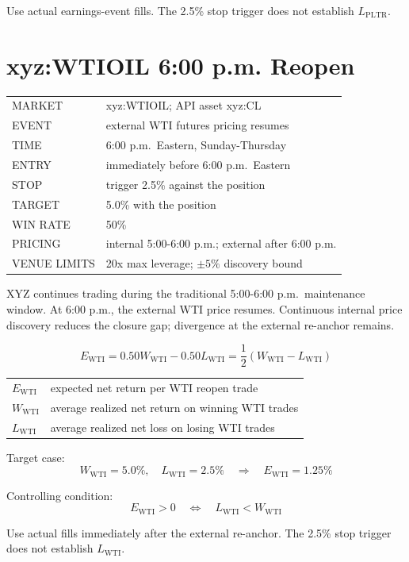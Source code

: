 \documentclass[10pt]{article}
\begin{document}
Use actual earnings-event fills. The 2.5\% stop trigger does not establish
$L_{\mathrm{PLTR}}$.

\section{xyz:WTIOIL 6:00 p.m. Reopen}

{\ttfamily\footnotesize
\begin{tabular}{@{}ll@{}}
MARKET & xyz:WTIOIL; API asset xyz:CL \\
EVENT & external WTI futures pricing resumes \\
TIME & 6:00 p.m.\ Eastern, Sunday-Thursday \\
ENTRY & immediately before 6:00 p.m.\ Eastern \\
STOP & trigger 2.5\% against the position \\
TARGET & 5.0\% with the position \\
WIN RATE & 50\% \\
PRICING & internal 5:00-6:00 p.m.; external after 6:00 p.m. \\
VENUE LIMITS & 20x max leverage; $\pm 5\%$ discovery bound
\end{tabular}}

XYZ continues trading during the traditional 5:00-6:00 p.m.\ maintenance
window. At 6:00 p.m., the external WTI price resumes. Continuous internal price
discovery reduces the closure gap; divergence at the external re-anchor remains.

\begin{equation}
  E_{\mathrm{WTI}}
  =0.50W_{\mathrm{WTI}}-0.50L_{\mathrm{WTI}}
  =\frac{1}{2}\left(W_{\mathrm{WTI}}-L_{\mathrm{WTI}}\right)
\end{equation}
{\ttfamily\footnotesize
\begin{tabular}{@{}ll@{}}
$E_{\mathrm{WTI}}$ & expected net return per WTI reopen trade \\
$W_{\mathrm{WTI}}$ & average realized net return on winning WTI trades \\
$L_{\mathrm{WTI}}$ & average realized net loss on losing WTI trades
\end{tabular}}

Target case:
\begin{equation}
  W_{\mathrm{WTI}}=5.0\%,\quad L_{\mathrm{WTI}}=2.5\%
  \quad\Longrightarrow\quad E_{\mathrm{WTI}}=1.25\%
\end{equation}

Controlling condition:
\begin{equation}
  E_{\mathrm{WTI}}>0
  \quad\Longleftrightarrow\quad
  L_{\mathrm{WTI}}<W_{\mathrm{WTI}}
\end{equation}

Use actual fills immediately after the external re-anchor. The 2.5\% stop
trigger does not establish $L_{\mathrm{WTI}}$.
\end{document}
